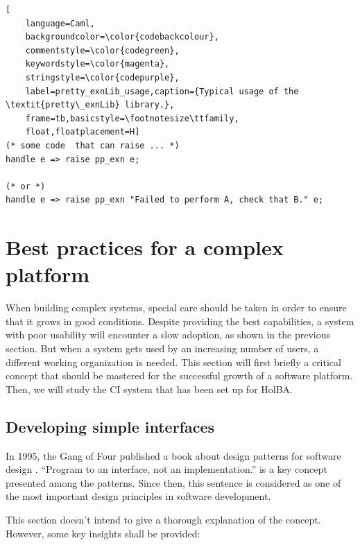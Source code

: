 \documentclass{kththesis}
\begin{document}
{\begin{lstlisting}[
    language=Caml,
    backgroundcolor=\color{codebackcolour},
    commentstyle=\color{codegreen},
    keywordstyle=\color{magenta},
    stringstyle=\color{codepurple},
    label=pretty_exnLib_usage,caption={Typical usage of the \textit{pretty\_exnLib} library.},
    frame=tb,basicstyle=\footnotesize\ttfamily,
    float,floatplacement=H]
(* some code  that can raise ... *)
handle e => raise pp_exn e;

(* or *)
handle e => raise pp_exn "Failed to perform A, check that B." e;
\end{lstlisting}


\section{Best practices for a complex platform} \label{best-practices-complex-platform}

When building complex systems, special care should be taken in order to ensure that it grows in good conditions. Despite providing the best capabilities, a system with poor usability will encounter a slow adoption, as shown in the previous section. But when a system gets used by an increasing number of users, a different working organization is needed. This section will first briefly a critical concept that should be mastered for the successful growth of a software platform. Then, we will study the \gls{CI} system that has been set up for HolBA.

\subsection{Developing simple interfaces}


In 1995, the Gang of Four published a book about design patterns for software design \cite{gamma_design_1995}. ``Program to an interface, not an implementation.'' is a key concept presented among the patterns. Since then, this sentence is considered as one of the most important design principles in software development.

This section doesn't intend to give a thorough explanation of the concept. However, some key insights shall be provided:

}
\end{document}
